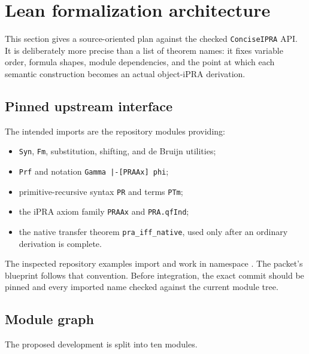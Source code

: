 \section{Lean formalization architecture}
\label{sec:lean-plan}

This section gives a source-oriented plan against the checked \texttt{ConciseIPRA} API.  It is deliberately more precise than a list of theorem names: it fixes variable order, formula shapes, module dependencies, and the point at which each semantic construction becomes an actual object-iPRA derivation.

\subsection{Pinned upstream interface}

The intended imports are the repository modules providing:

\begin{itemize}
\item \texttt{Syn}, \texttt{Fm}, substitution, shifting, and de Bruijn utilities;
\item \texttt{Prf} and notation \texttt{Gamma |-[PRAAx] phi};
\item primitive-recursive syntax \texttt{PR} and terms \texttt{PTm};
\item the iPRA axiom family \texttt{PRAAx} and \texttt{PRA.qfInd};
\item the native transfer theorem \texttt{pra\_iff\_native}, used only after an ordinary derivation is complete.
\end{itemize}

The inspected repository examples import  and work in namespace .  The packet's blueprint follows that convention.  Before integration, the exact commit should be pinned and every imported name checked against the current module tree.

\subsection{Module graph}

The proposed development is split into ten modules.

